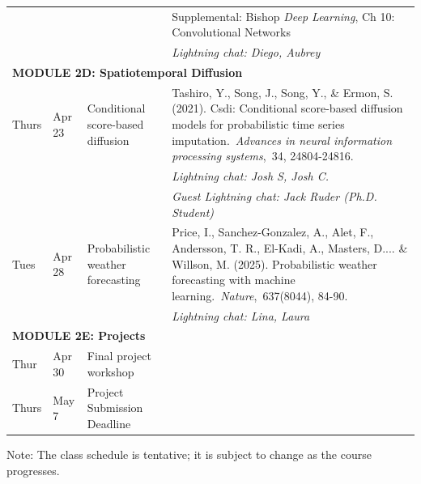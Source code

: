 \documentclass[letterpaper]{inzane_syllabus} %
\begin{document}
\begin{center}
\begin{tabularx}{\textwidth}{p{2cm}p{2cm}p{8cm}p{8cm}}
& & & Supplemental: Bishop \textit{Deep Learning}, Ch 10: Convolutional Networks \\
 & & & \textit{Lightning chat: Diego, Aubrey} \\
\hline
\multicolumn{4}{l}{\textbf{\textcolor{myCOLOR}{\large MODULE 2D: Spatiotemporal Diffusion}}} \\
\hline
Thurs &  Apr 23 & Conditional score-based diffusion & Tashiro, Y., Song, J., Song, Y., \& Ermon, S. (2021). Csdi: Conditional score-based diffusion models for probabilistic time series imputation. \textit{Advances in neural information processing systems}, 34, 24804-24816. \\
 & & & \textit{Lightning chat: Josh S, Josh C.} \\
  & & & \textit{Guest Lightning chat: Jack Ruder (Ph.D. Student)} \\
Tues &  Apr 28 & Probabilistic weather forecasting  & Price, I., Sanchez-Gonzalez, A., Alet, F., Andersson, T. R., El-Kadi, A., Masters, D.... \& Willson, M. (2025). Probabilistic weather forecasting with machine learning. \textit{Nature}, 637(8044), 84-90. \\
 & & & \textit{Lightning chat: Lina, Laura} \\
\hline
\multicolumn{4}{l}{\textbf{\textcolor{myCOLOR}{\large MODULE 2E: Projects}}} \\
\hline
Thur &  Apr 30 & Final project workshop & \\
Thurs & May 7 & Project Submission Deadline & \\
\hline
\hline 
\end{tabularx}
Note: The class schedule is tentative; it is subject to change as the course progresses.
\end{center}

%

\vspace{0.4cm}






\newpage
\makeFullPage
\end{document}
